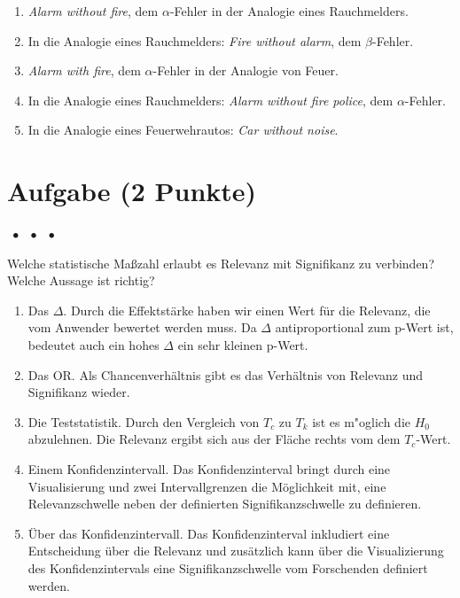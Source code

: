 \documentclass[a4paper, 9pt]{scrartcl}\usepackage[]{graphicx}\usepackage[]{xcolor}
\begin{document}
\begin{enumerate}
\item [\textbf{A} \msquare] \textit{Alarm without fire}, dem $\alpha$-Fehler in der Analogie eines Rauchmelders.
\item [\textbf{B} \msquare] In die Analogie eines Rauchmelders: \textit{Fire without alarm}, dem $\beta$-Fehler.
\item [\textbf{C} \msquare] \textit{Alarm with fire}, dem $\alpha$-Fehler in der Analogie von Feuer.
\item [\textbf{D} \msquare] In die Analogie eines Rauchmelders: \textit{Alarm without fire police}, dem $\alpha$-Fehler.
\item [\textbf{E} \msquare] In die Analogie eines Feuerwehrautos: \textit{Car without noise}.
\end{enumerate}

\section{Aufgabe \hfill (2 Punkte)}

\ifcollection
\begin{flushright}
\tiny\vspace{-2Ex}
\textbf{\examinhaltstart}
\exammodulestat $\;\bullet$
\exammodulestatbbv $\;\bullet$
\exammodulestatversuch $\;\bullet$
\exammodulebiostat
\vspace{-1Ex}
\end{flushright}
\fi




Welche statistische Maßzahl erlaubt es Relevanz mit Signifikanz zu verbinden? Welche Aussage ist richtig?



\begin{enumerate}
\item [\textbf{A} \msquare] Das $\Delta$. Durch die Effektstärke haben wir einen Wert für die Relevanz, die vom Anwender bewertet werden muss. Da $\Delta$ antiproportional zum p-Wert ist, bedeutet auch ein hohes $\Delta$ ein sehr kleinen p-Wert.
\item [\textbf{B} \msquare] Das OR. Als Chancenverhältnis gibt es das Verhältnis von Relevanz und Signifikanz wieder.
\item [\textbf{C} \msquare] Die Teststatistik. Durch den Vergleich von $T_c$ zu $T_k$ ist es m{"o}glich die $H_0$ abzulehnen. Die Relevanz ergibt sich aus der Fläche rechts vom dem $T_c$-Wert.
\item [\textbf{D} \msquare] Einem Konfidenzintervall. Das Konfidenzinterval bringt durch eine Visualisierung und zwei Intervallgrenzen die Möglichkeit mit, eine Relevanzschwelle neben der definierten Signifikanzschwelle zu definieren.
\item [\textbf{E} \msquare] Über das Konfidenzintervall. Das Konfidenzinterval inkludiert eine Entscheidung über die Relevanz und zusätzlich kann über die Visualizierung des Konfidenzintervals eine Signifikanzschwelle vom Forschenden definiert werden.
\end{enumerate}
\end{document}
